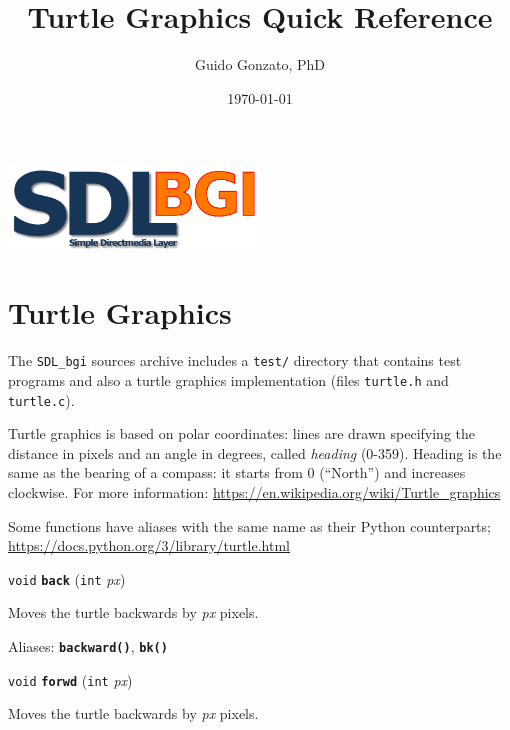 \documentclass[a4paper,11pt]{article}
\newcommand{\SDLbgi}{\texttt{SDL\_bgi}}
\newcommand{\V}{\texttt{void}}      %
\newcommand{\I}{\texttt{int}}       %
\newcommand{\func}[1]{\textbf{\texttt{#1}}}  %
\newcommand{\A}[1]{\emph{#1}}       %
\newcommand{\file}[1]{\texttt{#1}}
\newenvironment{bgi}
{ %
  \begin{snugshade}
}
{ %
  \end{snugshade}
}
\begin{document}
\title{Turtle Graphics Quick Reference}

\author{Guido Gonzato, PhD}

\date{\today}

\maketitle

\begin{center}
  \includegraphics[width=0.5\textwidth]{SDL_bgi_logo.png}  
\end{center}


\section{Turtle Graphics}

The \SDLbgi{} sources archive includes a \file{test/} directory that
contains test programs and also a turtle graphics implementation
(files \file{turtle.h} and \file{turtle.c}).

Turtle graphics is based on polar coordinates: lines are drawn
specifying the distance in pixels and an angle in degrees, called
\emph{heading} (0-359). Heading is the same as the bearing of a
compass: it starts from 0 (``North'') and increases clockwise. For
more information: \url{https://en.wikipedia.org/wiki/Turtle_graphics}

Some functions have aliases with the same name as their Python
counterparts; \url{https://docs.python.org/3/library/turtle.html}


\begin{bgi}
\V{} \func{back} (\I{} \A{px})
\end{bgi}

Moves the turtle backwards by \A{px} pixels.

Aliases: \func{backward()}, \func{bk()}


\begin{bgi}
\V{} \func{forwd} (\I{} \A{px})
\end{bgi}

Moves the turtle backwards by \A{px} pixels.
\end{document}
